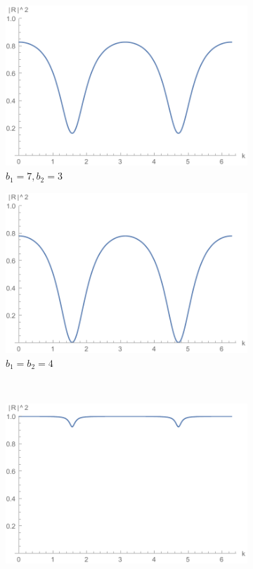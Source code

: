 \begin{figure}[h]
  \begin{subfigure}[t]{0.5\textwidth}
    \includegraphics[width=1\textwidth]{img/2gen_reflection_l=1_b1=3_b2=7}
    \caption{$b_1=7, b_2=3$}
  \end{subfigure}
  \begin{subfigure}[t]{0.5\textwidth}
    \includegraphics[width=1\textwidth]{img/2gen_reflection_l=1_b1=b2=4}
    \caption{$b_1=b_2=4$}
  \end{subfigure}
  \\
  \begin{subfigure}[t]{0.5\textwidth}
    \includegraphics[width=1\textwidth]{img/2gen_reflection_l=1_b1=500_b2=10}

\end{subfigure}
\end{figure}
